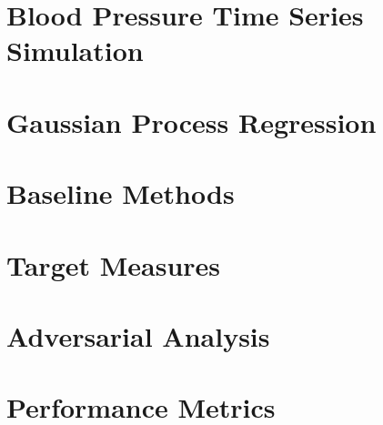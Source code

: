 \section{Blood Pressure Time Series Simulation}\label{sec:blood-pressure-time-series-simulation}



\section{Gaussian Process Regression}\label{sec:gaussian-process-regression}


\section{Baseline Methods}\label{sec:baseline-methods}


\section{Target Measures}\label{sec:target-measures}


\section{Adversarial Analysis}\label{sec:adversarial-analysis}


\section{Performance Metrics}\label{sec:performance-metric}




















